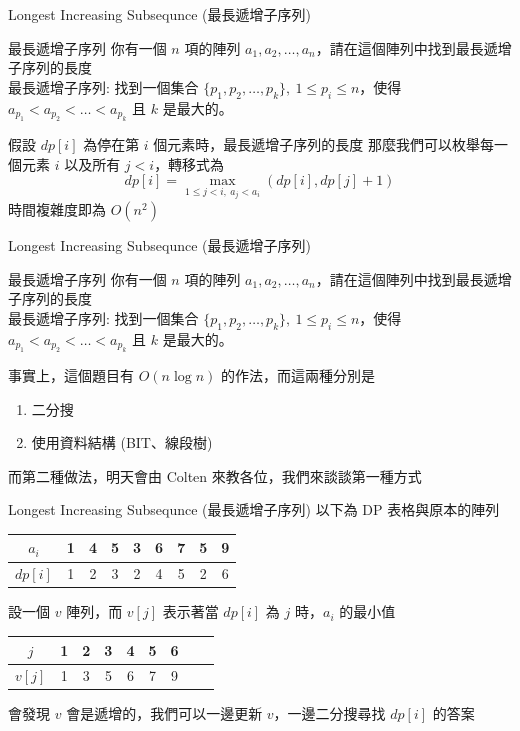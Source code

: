 \documentclass[aspectratio=169]{beamer}
\begin{document}
\begin{frame}{Longest Increasing Subsequnce (最長遞增子序列)}
    \begin{block}{最長遞增子序列}
        你有一個 $n$ 項的陣列 $a_1,a_2,\dots,a_n$，請在這個陣列中找到最長遞增子序列的長度 \\
        \vspace{5mm}
        最長遞增子序列: 找到一個集合 $\{p_1,p_2,\dots,p_k\}, \ 1 \le p_i \le n$，使得 $a_{p_1} < a_{p_2} < \dots < a_{p_k}$ 且 $k$ 是最大的。
    \end{block}
    假設 $dp[i]$ 為停在第 $i$ 個元素時，最長遞增子序列的長度 \pause \newline
    那麼我們可以枚舉每一個元素 $i$ 以及所有 $j < i$，轉移式為 
    $$dp[i] = \max_{1 \le j < i, \ a_j < a_i}(dp[i], dp[j]+1)$$ \newline \pause
    時間複雜度即為 $O(n^2)$
\end{frame}

\begin{frame}{Longest Increasing Subsequnce (最長遞增子序列)}
    \begin{block}{最長遞增子序列}
        你有一個 $n$ 項的陣列 $a_1,a_2,\dots,a_n$，請在這個陣列中找到最長遞增子序列的長度 \\
        \vspace{5mm}
        最長遞增子序列: 找到一個集合 $\{p_1,p_2,\dots,p_k\}, \ 1 \le p_i \le n$，使得 $a_{p_1} < a_{p_2} < \dots < a_{p_k}$ 且 $k$ 是最大的。
    \end{block}
    事實上，這個題目有 $O(n \log n)$ 的作法，而這兩種分別是
    \begin{enumerate}
        \item 二分搜
        \item 使用資料結構 (BIT、線段樹)
    \end{enumerate}
    而第二種做法，明天會由 Colten 來教各位，我們來談談第一種方式
\end{frame}

\begin{frame}{Longest Increasing Subsequnce (最長遞增子序列)}
    以下為 DP 表格與原本的陣列 \\
    \begin{center}
        \begin{tabular}{|c||c|c|c|c|c|c|c|c|}
        $a_i$   &  1 & 4 & 5 & 3 & 6 & 7 & 5 & 9 \\
        \hline
        $dp[i]$ &  1 & 2 & 3 & 2 & 4 & 5 & 2 & 6
        \end{tabular}
    \end{center} \pause 
    
    設一個 $v$ 陣列，而 $v[j]$ 表示著當 $dp[i]$ 為 $j$ 時，$a_i$ 的最小值
    
    \begin{center}
        \begin{tabular}{|c||c|c|c|c|c|c|c|c|}
        $j$   &  1 & 2 & 3 & 4 & 5 & 6 \\
        \hline
        $v[j]$ &  1 & 3 & 5 & 6 & 7 & 9
        \end{tabular}
    \end{center} \pause 
    會發現 $v$ 會是遞增的，我們可以一邊更新 $v$，一邊二分搜尋找 $dp[i]$ 的答案
\end{frame}
\end{document}

